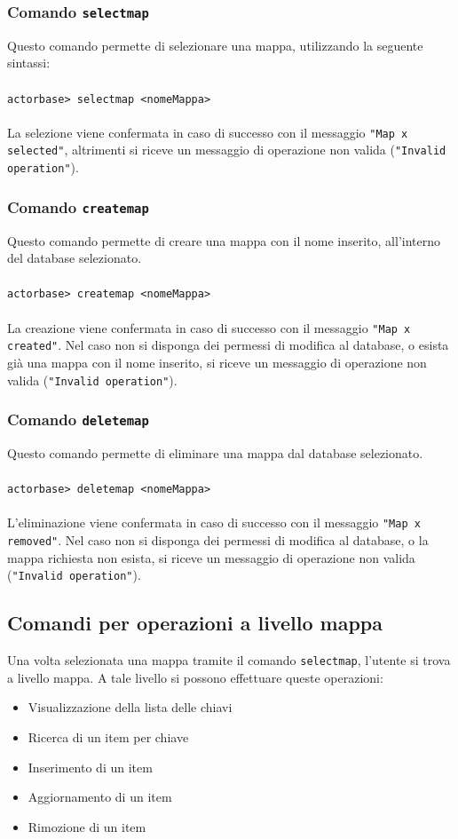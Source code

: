 \documentclass[a4paper]{article}
\begin{document}
	\subsubsection{Comando \texttt{selectmap}}
	Questo comando permette di selezionare una mappa, utilizzando la seguente sintassi:
	\\ \\
	\texttt{actorbase>	selectmap <nomeMappa>}
	\\ \\
	La selezione viene confermata in caso di successo con il messaggio \texttt{"Map x selected"}, altrimenti si 
	riceve un messaggio di operazione non valida (\texttt{"Invalid operation"}).

	\subsubsection{Comando \texttt{createmap}}
	Questo comando permette di creare una mappa con il nome inserito, all'interno del database selezionato.
	\\ \\
	\texttt{actorbase>	createmap <nomeMappa>}
	\\ \\
	La creazione viene confermata in caso di successo con il messaggio \texttt{"Map x created"}. Nel caso non si 
	disponga dei permessi di modifica al database, o esista già una mappa con il nome inserito, si riceve un messaggio 
	di operazione non valida (\texttt{"Invalid operation"}).

	\subsubsection{Comando \texttt{deletemap}}
	Questo comando permette di eliminare una mappa dal database selezionato. 
	\\ \\
	\texttt{actorbase>	deletemap <nomeMappa>}
	\\ \\
	L'eliminazione viene confermata in caso di successo con il messaggio \texttt{"Map x removed"}. Nel caso non si disponga 
	dei permessi di modifica al database, o la mappa richiesta non esista, si riceve un messaggio di operazione 
	non valida (\texttt{"Invalid operation"}).
	

	\subsection{Comandi per operazioni a livello mappa}
	Una volta selezionata una mappa tramite il comando \texttt{selectmap}, l'utente si trova a livello mappa. A tale livello si possono effettuare queste operazioni:
	\begin{itemize}
		\item Visualizzazione della lista delle chiavi
		\item Ricerca di un item per chiave
		\item Inserimento di un item 
		\item Aggiornamento di un item
		\item Rimozione di un item
	\end{itemize}
\end{document}

